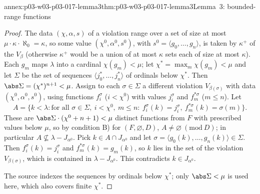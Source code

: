 \begin{annexitem}{annex:p03-w03-p03-017-lemma3}{thm:p03-w03-p03-017-lemma3}{Lemma~3: bounded-range functions}
\begin{proof}
The data \((\chi,\alpha,s)\) of a violation range over a set of size at most
\(\mu\cdot\kappa\cdot\aleph_0=\kappa\), so some value
\((\chi^0,\alpha^0,s^0)\), with \(s^0=\langle g_0,\ldots,g_n\rangle\), is taken
by \(\kappa^+\) of the \(V_\beta\) (otherwise \(\kappa^+\) would be a union of
at most \(\kappa\) sets each of size at most \(\kappa\)).  Each \(g_m\) maps
\(\lambda\) into a cardinal \(\chi(g_m)<\mu\); let \(\chi^*=\max_m\chi(g_m)<\mu\)
and let \(\Sigma\) be the set of sequences
\(\langle j^*_0,\ldots,j^*_n\rangle\) of ordinals below \(\chi^*\).  Then
\(\abs\Sigma=(\chi^*)^{n+1}<\mu\).  Assign to each \(\sigma\in\Sigma\) a
different violation \(V_{\beta(\sigma)}\) with data \((\chi^0,\alpha^0,s^0)\),
using functions \(f^\sigma_i\) (\(i<\chi^0\)) with values \(j^\sigma_i\) and
\(f^{*\sigma}_m\) (\(m\le n\)).  Let
\[
 A=\{k<\lambda:\text{for all }\sigma\in\Sigma,\ i<\chi^0,\ m\le n:\
 f^\sigma_i(k)=j^\sigma_i,\ f^{*\sigma}_m(k)=\sigma(m)\}.
\]
These are \(\abs\Sigma\cdot(\chi^0+n+1)<\mu\) distinct functions from \(F\)
with prescribed values below \(\mu\), so by condition B) for
\((F,\varnothing,D)\), \(A\neq\varnothing\ (\mathrm{mod}\ D)\); in particular
\(A\not\subseteq\lambda-J_{\alpha^0}\).  Pick \(k\in A\cap J_{\alpha^0}\) and
let \(\sigma=\langle g_0(k),\ldots,g_n(k)\rangle\in\Sigma\).  Then
\(f^\sigma_i(k)=j^\sigma_i\) and \(f^{*\sigma}_m(k)=g_m(k)\), so \(k\) lies in
the set of the violation \(V_{\beta(\sigma)}\), which is contained in
\(\lambda-J_{\alpha^0}\).  This contradicts \(k\in J_{\alpha^0}\).

The source indexes the sequences by ordinals below \(\chi^*\); only
\(\abs\Sigma<\mu\) is used here, which also covers finite \(\chi^*\).
\end{proof}
\end{annexitem}

